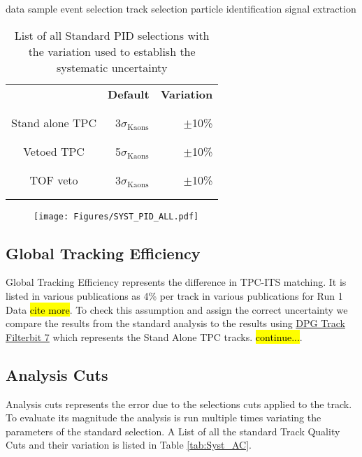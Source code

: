 data sample
event selection
track selection
particle identification
signal extraction


\begin{table}[h]
\center
\begin{tabular}{c|r|r}
					&\textbf{Default}							&\textbf{Variation}		\\
					\\ \hline \\
Stand alone TPC		&3$\sigma_{\text{Kaons}}$					& $\pm$10\%\\
					\\ \hline \\
Vetoed TPC			&5$\sigma_{\text{Kaons}}$					& $\pm$10\%\\
					\\ \hline \\
TOF veto				&3$\sigma_{\text{Kaons}}$					& $\pm$10\%\\
					\\ \hline \\

\end{tabular}
\caption{List of all Standard PID selections with the variation used to establish the systematic uncertainty}
\label{tab:Syst_SE}
\end{table}

\begin{figure}
\centering
\texttt{[image: Figures/SYST\_PID\_ALL.pdf]}
\label{fig:1Dfit}
\caption{}
\end{figure}

\subsection{Global Tracking Efficiency}
Global Tracking Efficiency represents the difference in TPC-ITS matching. It is listed in various publications as 4\% per track in various publications for Run 1 Data \cite{PrevPubMult} \hl{cite more}. To check this assumption and assign the correct uncertainty we compare the results from the standard analysis to the results using \href{https://twiki.cern.ch/twiki/bin/viewauth/ALICE/AliDPGtoolsFilteringCuts#Run_flag_1000_AddTrackCutsLHC10b}{DPG Track Filterbit 7} which represents the Stand Alone TPC tracks. \hl{continue...}.

\subsection{Analysis Cuts}
Analysis cuts represents the error due to the selections cuts applied to the track. To evaluate its magnitude the analysis is run multiple times variating the parameters of the standard selection. A List of all the standard Track Quality Cuts and their variation is listed in Table \ref{tab:Syst_AC}.

